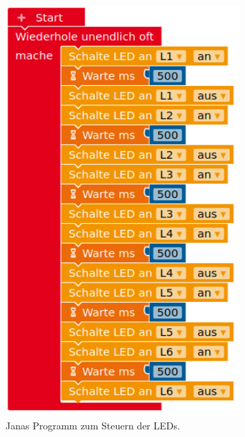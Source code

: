 \documentclass[ngerman, 11pt]{scrreprt}
\begin{document}
	\begin{figure}[H]
		\begin{adjustwidth}{-1.5cm}{1.5cm}
			\begin{minipage}{0.58\textwidth}
				\centering
				\includegraphics[width=0.8\textwidth]{../pics/lauflicht-ohne-variable.png}
				\caption{Janas Programm zum Steuern der LEDs.}
			\end{minipage}
			\hfill
			\begin{minipage}{0.58\textwidth}
				\centering

\end{minipage}
\end{adjustwidth}
\end{figure}
\end{document}
